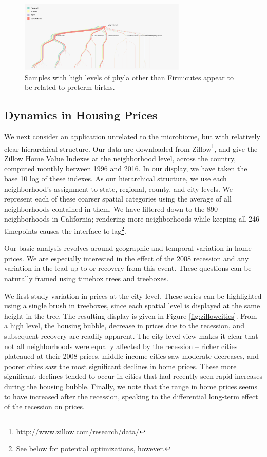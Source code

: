 \documentclass[12pt]{article}
\begin{document}
\begin{figure}

{\centering \includegraphics[width=300px]{figure/preterm_preterm}

}

\caption{Samples with high levels of phyla other than Firmicutes appear to be related to preterm births.}\label{fig:pretermpreterm}
\end{figure}

\subsection{Dynamics in Housing Prices}\label{zillow-study}

We next consider an application unrelated to the microbiome, but with relatively
clear hierarchical structure. Our data are downloaded from
Zillow\footnote{\url{http://www.zillow.com/research/data/}}, and give the Zillow
Home Value Indexes at the neighborhood level, across the country, computed
monthly between 1996 and 2016. In our display, we have taken the base 10 log of
these indexes. As our hierarchical structure, we use each neighborhood's
assignment to state, regional, county, and city levels. We represent each of
these coarser spatial categories using the average of all neighborhoods
contained in them. We have filtered down to the 890 neighborhoods in California;
rendering more neighborhoods while keeping all 246 timepoints causes the
interface to lag\footnote{See below for potential optimizations, however.}.

Our basic analysis revolves around geographic and temporal variation in home
prices. We are especially interested in the effect of the 2008 recession and any
variation in the lead-up to or recovery from this event. These questions can be
naturally framed using timebox trees and treeboxes.

We first study variation in prices at the city level. These series can be
highlighted using a single brush in treeboxes, since each spatial level is
displayed at the same height in the tree. The resulting display is given in
Figure \ref{fig:zillowcities}. From a high level, the housing bubble, decrease
in prices due to the recession, and subsequent recovery are readily apparent.
The city-level view makes it clear that not all neighborhoods were equally
affected by the recession -- richer cities plateaued at their 2008 prices,
middle-income cities saw moderate decreases, and poorer cities saw the most
significant declines in home prices. These more significant declines tended to
occur in cities that had recently seen rapid increases during the housing
bubble. Finally, we note that the range in home prices seems to have increased
after the recession, speaking to the differential long-term effect of the
recession on prices.
\end{document}
